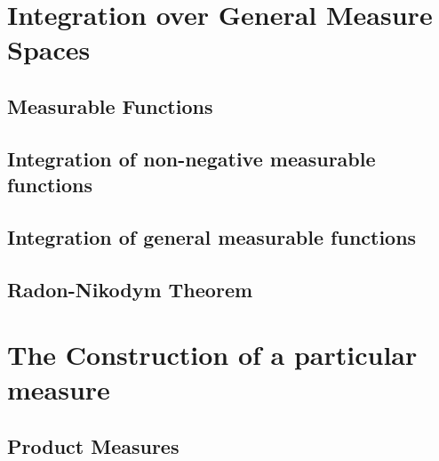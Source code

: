 \section{Integration over General Measure Spaces}
\subsection{Measurable Functions}
\subsection{Integration of non-negative measurable functions}
\subsection{Integration of general measurable functions}
\subsection{Radon-Nikodym Theorem}


\setcounter{section}{19}
\section{The Construction of a particular measure}
\subsection{Product Measures}

